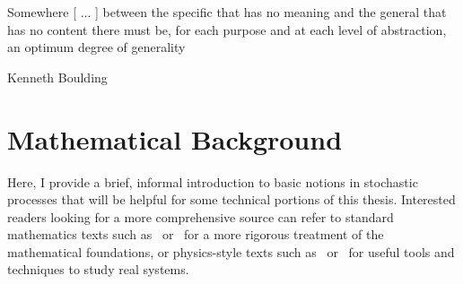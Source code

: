 \epigraph{\justifying Somewhere [ ... ] between the specific that has no meaning and the general that has no content there must be, for each purpose and at each level of abstraction, an optimum degree of generality}{Kenneth Boulding}

\section{Mathematical Background}\label{sec_math_background}

Here, I provide a brief, informal introduction to basic notions in stochastic processes that will be helpful for some technical portions of this thesis. Interested readers looking for a more comprehensive source can refer to standard mathematics texts such as~\cite{oksendal_stochastic_1998} or~\cite{karatzas_brownian_1998} for a more rigorous treatment of the mathematical foundations, or physics-style texts such as~\cite{gardiner_stochastic_2009} or~\cite{van_kampen_stochastic_1981} for useful tools and techniques to study real systems.

